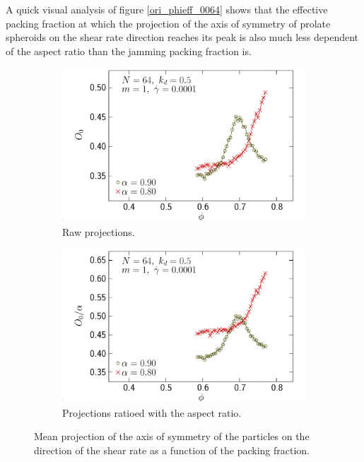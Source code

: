 \documentclass[class=report, float=false, crop=false]{standalone}
\begin{document}
A quick visual analysis of figure \ref{ori_phieff_0064} shows that the effective packing fraction at which the projection of the axis of symmetry of prolate spheroids on the shear rate direction reaches its peak is also much less dependent of the aspect ratio than the jamming packing fraction is.


\begin{figure}[h!]
\centering
    \begin{subfigure}[t]{0.49\textwidth}
        \centering
        \includegraphics[width=\textwidth]{figures/figs/ori0_phi_oblate_0064_KDk500_Ml100_GDh100}
        \caption{Raw projections.}
        \label{ori0_phi_oblate_0064_KDk500_Ml100_GDh100}
    \end{subfigure}
    \hfill
    \begin{subfigure}[t]{0.49\textwidth}
        \centering
        \includegraphics[width=\textwidth]{figures/figs/ori0al_phi_oblate_0064_KDk500_Ml100_GDh100}
        \caption{Projections ratioed with the aspect ratio.}
        \label{ori0al_phi_oblate_0064_KDk500_Ml100_GDh100}
    \end{subfigure}
    \caption{Mean projection of the axis of symmetry of the particles on the direction of the shear rate as a function of the packing fraction.}
    \label{ori_phi_oblate_0064}
\end{figure}
\end{document}
